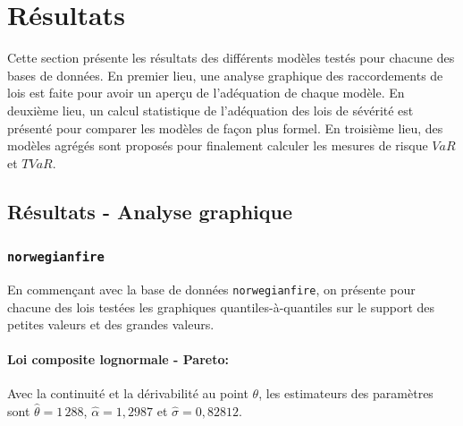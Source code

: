 \section{Résultats}\label{Sect_Resultats}
	Cette section présente les résultats des différents modèles testés pour chacune des bases de données. En premier lieu, une analyse graphique des raccordements de lois est faite pour avoir un aperçu de l'adéquation de chaque modèle. En deuxième lieu, un calcul statistique de l'adéquation des lois de sévérité est présenté pour comparer les modèles de façon plus formel. En troisième lieu, des modèles agrégés sont proposés pour finalement calculer les mesures de risque $VaR$ et $TVaR$.
 
 \subsection{Résultats - Analyse graphique}
 
	\subsubsection{\texttt{norwegianfire}}
	En commençant avec la base de données \texttt{norwegianfire}, on présente pour chacune des lois testées les graphiques quantiles-à-quantiles sur le support des petites valeurs et des grandes valeurs.
		
		\paragraph{Loi composite lognormale - Pareto:} Avec la continuité et la dérivabilité au point $\theta$, les estimateurs des paramètres sont $\hat{\theta} = 1\,288$, $\hat{\alpha} = 1,2987$ et $\hat{\sigma}=0,82812$.
		
